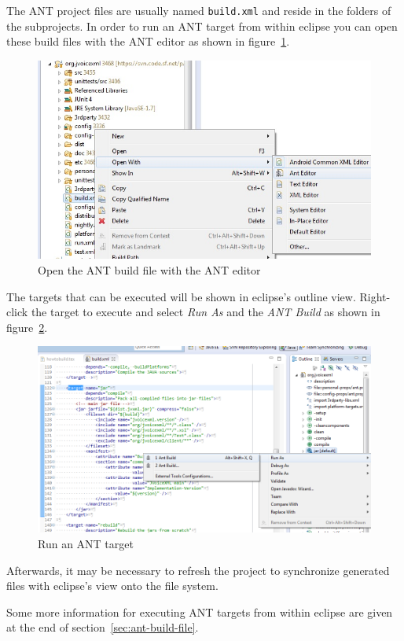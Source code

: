 \documentclass[11pt,a4paper]{article}
\begin{document}
The ANT project files are usually named \texttt{build.xml} and reside in
the folders of the subprojects. In order to run an ANT target from within
eclipse you can open these build files with the ANT editor as shown in
figure~\ref{fig:eclipse-open-ant-editor}.
\begin{figure}
\includegraphics[width=\linewidth]{eclipse-open-ant-editor}
\caption{Open the ANT build file with the ANT editor}
\label{fig:eclipse-open-ant-editor}
\end{figure}
The targets that can be executed will be shown in eclipse's outline view.
Right-click the target to execute and select \emph{Run As} and the
\emph{ANT Build} as shown in figure~\ref{fig:eclipse-run-ant}.
\begin{figure}
\includegraphics[width=\linewidth]{eclipse-run-ant}
\caption{Run an ANT target}
\label{fig:eclipse-run-ant}
\end{figure}
Afterwards, it may be necessary to refresh the project to synchronize generated
files with eclipse's view onto the file system.

Some more information for executing ANT targets from within eclipse are given at
the end of section~\ref{sec:ant-build-file}. 
\end{document}
